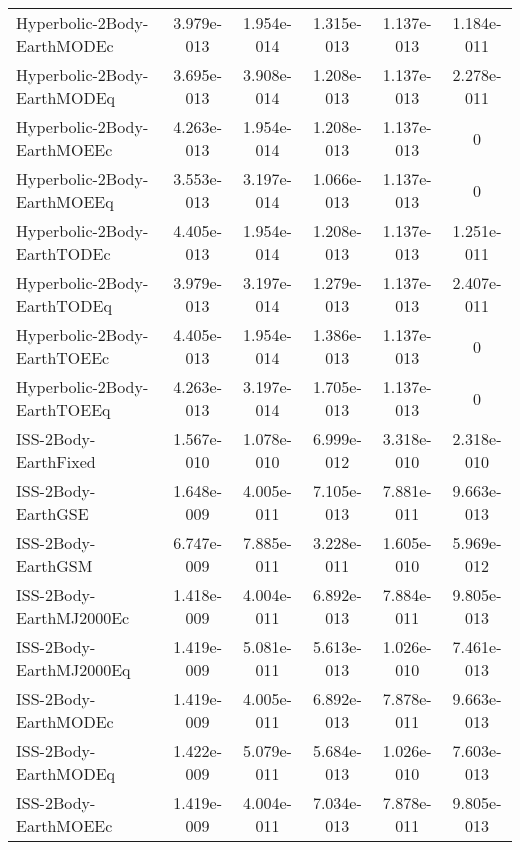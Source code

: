 \begin{table}[htbp!]
\begin{tabular}{lccccc}
         Hyperbolic-2Body-EarthMODEc & 3.979e-013 & 1.954e-014 & 1.315e-013 & 1.137e-013 & 1.184e-011 \\
         Hyperbolic-2Body-EarthMODEq & 3.695e-013 & 3.908e-014 & 1.208e-013 & 1.137e-013 & 2.278e-011 \\
         Hyperbolic-2Body-EarthMOEEc & 4.263e-013 & 1.954e-014 & 1.208e-013 & 1.137e-013 & 0 \\
         Hyperbolic-2Body-EarthMOEEq & 3.553e-013 & 3.197e-014 & 1.066e-013 & 1.137e-013 & 0 \\
         Hyperbolic-2Body-EarthTODEc & 4.405e-013 & 1.954e-014 & 1.208e-013 & 1.137e-013 & 1.251e-011 \\
         Hyperbolic-2Body-EarthTODEq & 3.979e-013 & 3.197e-014 & 1.279e-013 & 1.137e-013 & 2.407e-011 \\
         Hyperbolic-2Body-EarthTOEEc & 4.405e-013 & 1.954e-014 & 1.386e-013 & 1.137e-013 & 0 \\
         Hyperbolic-2Body-EarthTOEEq & 4.263e-013 & 3.197e-014 & 1.705e-013 & 1.137e-013 & 0 \\
         ISS-2Body-EarthFixed & 1.567e-010 & 1.078e-010 & 6.999e-012 & 3.318e-010 & 2.318e-010 \\
         ISS-2Body-EarthGSE & 1.648e-009 & 4.005e-011 & 7.105e-013 & 7.881e-011 & 9.663e-013 \\
         ISS-2Body-EarthGSM & 6.747e-009 & 7.885e-011 & 3.228e-011 & 1.605e-010 & 5.969e-012 \\
         ISS-2Body-EarthMJ2000Ec & 1.418e-009 & 4.004e-011 & 6.892e-013 & 7.884e-011 & 9.805e-013 \\
         ISS-2Body-EarthMJ2000Eq & 1.419e-009 & 5.081e-011 & 5.613e-013 & 1.026e-010 & 7.461e-013 \\
         ISS-2Body-EarthMODEc & 1.419e-009 & 4.005e-011 & 6.892e-013 & 7.878e-011 & 9.663e-013 \\
         ISS-2Body-EarthMODEq & 1.422e-009 & 5.079e-011 & 5.684e-013 & 1.026e-010 & 7.603e-013 \\
         ISS-2Body-EarthMOEEc & 1.419e-009 & 4.004e-011 & 7.034e-013 & 7.878e-011 & 9.805e-013 \\

\end{tabular}
\end{table}
